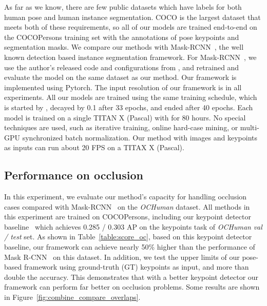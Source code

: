 \documentclass[10pt,twocolumn,letterpaper]{article}
\begin{document}
As far as we know, there are few public datasets which have labels for both human pose and human instance segmentation. COCO is the largest dataset that meets both of these requirements, so all of our models are trained end-to-end on the COCOPersons training set with the annotations of pose keypoints and segmentation masks. We compare our methods with Mask-RCNN~\cite{He2017Mask}, the well known detection based instance segmentation framework. For Mask-RCNN~\cite{He2017Mask}, we use the author's released code and configurations from \cite{Detectron2018}, and retrained and evaluate the model on the same dataset as our method. Our framework is implemented using Pytorch. The input resolution of our framework is 
 in all experiments. 
All our models are trained using the same training schedule, which is started by , decayed by 0.1 after 33 epochs, and ended after 40 epochs. Each model is trained on a single TITAN X (Pascal) with  for 80 hours. No special techniques are used, such as iterative training, online hard-case mining, or multi-GPU synchronized batch normalization. Our method with images and keypoints as inputs can run about 20 FPS on a TITAX X (Pascal).

\subsection{Performance on occlusion}

In this experiment, we evaluate our method's capacity for handling occlusion cases compared with Mask-RCNN~\cite{He2017Mask} on the \emph{OCHuman} dataset. All methods in this experiment are trained on COCOPersons, including our keypoint detector baseline~\cite{Newell2016Associative} which achieves 0.285 / 0.303 AP on the keypoints task of \emph{OCHuman} \emph{val / test} set. As shown in Table~\ref{table:score_oc}, based on this keypoint detector baseline, our framework can achieve nearly 50\% higher than the performance of Mask R-CNN~\cite{He2017Mask} on this dataset. In addition, we test the upper limits of our pose-based framework using ground-truth (GT) keypoints as input, and more than double the accuracy. This demonstrates that with a better keypoint detector our framework can perform far better on occlusion problems.  Some results are shown in Figure~\ref{fig:combine_compare_overlaps}. 
\end{document}
